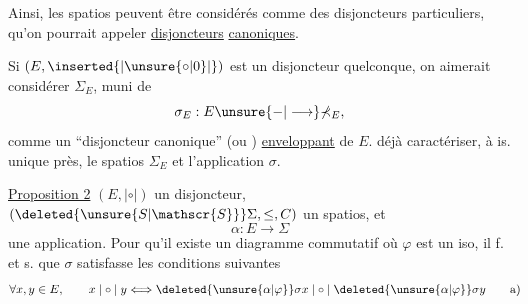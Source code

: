 Ainsi, les spatios peuvent être considérés comme des disjoncteurs particuliers, qu'on pourrait appeler \uline{disjoncteurs} \uline{canoniques}. 

Si $(E,\inserted{\mathrel{|\unsure{\circ|0}|}})$ est un disjoncteur quelconque, on aimerait considérer $ \mathbb{\Sigma}_{E}$, muni de
\[
\sigma_{E}:E\unsure{-|\longrightarrow}\mathbb{\Sigma}_{E},
\]
comme un ``disjoncteur canonique'' (ou ) \uline{enveloppant} de $E$.  déjà caractériser, à is. unique près, le spatios $\mathbb{\Sigma}_{E}$ et l'application $\sigma$.

\uline{Proposition 2}  $(E,\mathrel{|\circ|})$ un disjoncteur, $(\deleted{\unsure{S|\mathscr{S}}}\Sigma,\leq,C)$ un spatios, et
\[
\alpha:E\longrightarrow\Sigma
\]
une application. Pour qu'il existe un diagramme commutatif
où $\varphi$ est un iso, il f. et s. que $\sigma$ satisfasse les  conditions suivantes
\[
\forall x,y\in E,\qquad x\mathrel{|\circ|}y\Longleftrightarrow
\deleted{\unsure{\alpha|\varphi}}\sigma x\mathrel{|\circ|}\deleted{\unsure{\alpha|\varphi}}\sigma y
\tag*{\makebox[0pt][r]{\makebox[\displaywidth][l]{a)}}}
\]
